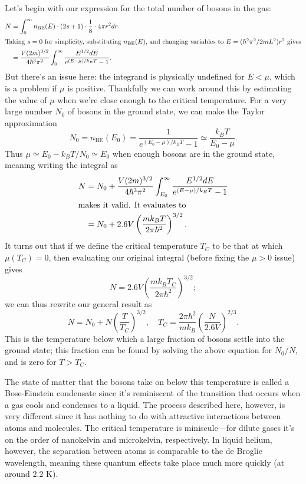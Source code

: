 \documentclass[../p052main.tex]{subfiles}
\begin{document}
Let's begin with our expression for the total number of bosons in the gas:
\begin{align*}
    N &= \int_{0}^{\infty} n_\textrm{BE}(E) \cdot (2s+1) \cdot \frac{1}{8} \cdot 4\pi r^2 dr. \\
    \intertext{Taking $s=0$ for simplicity, substituting $n_\textrm{BE}(E)$, and changing variables to $E = (\hbar^2\pi^2 / 2mL^2)r^2$ gives}
    &= \frac{V(2m)^{3 / 2}}{4\hbar^3 \pi^2} \int_{0}^{\infty} \frac{E^{1 / 2} dE}{e^{(E - \mu)/k_BT} - 1}.
\end{align*}
But there's an issue here: the integrand is physically undefined for $E < \mu$, which is a problem if $\mu$ is positive.
Thankfully we can work around this by estimating the value of $\mu$ when we're close enough to the critical temperature.
For a very large number $N_0$ of bosons in the ground state, we can make the Taylor approximation
\[ N_0 = n_\textrm{BE}(E_0) = \frac{1}{e^{(E_0 - \mu) / k_BT} - 1} \simeq \frac{k_BT}{E_0 - \mu}. \]
Thus $\mu \simeq E_0 - k_BT / N_0 \simeq E_0$ when enough bosons are in the ground state, meaning writing the integral as
\begin{align*}
    N &= N_0 + \frac{V(2m)^{3 / 2}}{4\hbar^3 \pi^2} \int_{E_0}^{\infty} \frac{E^{1 / 2} dE}{e^{(E - \mu)/k_BT} - 1} \\
    \intertext{makes it valid. It evaluates to}
    &= N_0 + 2.6V \left( \frac{mk_BT}{2\pi\hbar^2} \right)^{3 / 2}.
\end{align*}
It turns out that if we define the critical temperature $T_C$ to be that at which $\mu(T_C) = 0$, then evaluating our original integral (before fixing the $\mu > 0$ issue) gives
\[ N = 2.6V \left( \frac{mk_BT_C}{2\pi\hbar^2} \right)^{3 / 2}; \]
we can thus rewrite our general result as
\[ N = N_0 + N \left( \frac{T}{T_C} \right)^{3 / 2}, \quad T_C = \frac{2\pi\hbar^2}{mk_B} \left( \frac{N}{2.6V} \right)^{2 / 3}. \]
This is the temperature below which a large fraction of bosons settle into the ground state; this fraction can be found by solving the above equation for $N_0 / N$, and is zero for $T > T_C$.

The state of matter that the bosons take on below this temperature is called a Bose-Einstein condensate since it's reminiscent of the transition that occurs when a gas cools and condenses to a liquid.
The process described here, however, is very different since it has nothing to do with attractive interactions between atoms and molecules.
The critical temperature is miniscule---for dilute gases it's on the order of nanokelvin and microkelvin, respectively.
In liquid helium, however, the separation between atoms is comparable to the de Broglie wavelength, meaning these quantum effects take place much more quickly (at around 2.2 K).
\end{document}
